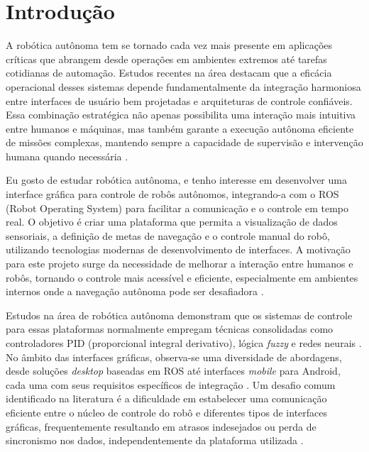 \section{Introdução}



A robótica autônoma tem se tornado cada vez mais presente em aplicações críticas que abrangem desde operações em ambientes extremos até tarefas cotidianas de automação. Estudos recentes na área destacam que a eficácia operacional desses sistemas depende fundamentalmente da integração harmoniosa entre interfaces de usuário bem projetadas e arquiteturas de controle confiáveis. Essa combinação estratégica não apenas possibilita uma interação mais intuitiva entre humanos e máquinas, mas também garante a execução autônoma eficiente de missões complexas, mantendo sempre a capacidade de supervisão e intervenção humana quando necessária \cite{IntroAR}.
 

Eu gosto de estudar robótica autônoma, e tenho interesse em desenvolver uma interface gráfica para controle de robôs autônomos, integrando-a com o ROS (Robot Operating System) para facilitar a comunicação e o controle em tempo real. O objetivo é criar uma plataforma que permita a visualização de dados sensoriais, a definição de metas de navegação e o controle manual do robô, utilizando tecnologias modernas de desenvolvimento de interfaces. A motivação para este projeto surge da necessidade de melhorar a interação entre humanos e robôs, tornando o controle mais acessível e eficiente, especialmente em ambientes internos onde a navegação autônoma pode ser desafiadora \cite{IntroROS}.


Estudos na área de robótica autônoma demonstram que os sistemas de controle para essas plataformas normalmente empregam técnicas consolidadas como controladores PID (proporcional integral derivativo), lógica \textit{fuzzy} e redes neurais \cite{KleytinhoBasico}. No âmbito das interfaces gráficas, observa-se uma diversidade de abordagens, desde soluções \textit{desktop} baseadas em ROS até interfaces \textit{mobile} para Android, cada uma com seus requisitos específicos de integração \cite{robo2wd, Teleoperacao}. Um desafio comum identificado na literatura é a dificuldade em estabelecer uma comunicação eficiente entre o núcleo de controle do robô e diferentes tipos de interfaces gráficas, frequentemente resultando em atrasos indesejados ou perda de sincronismo nos dados, independentemente da plataforma utilizada \cite{IntroROS}.

